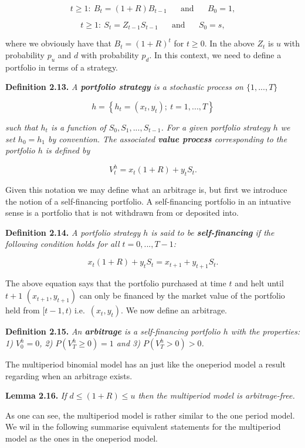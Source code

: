 \documentclass[
]{article}
\begin{document}
\[
t\ge1:\ B_t=(1+R)B_{t-1}\hspace{20pt}\text{and}\hspace{20pt}B_0=1,
\]

\[
t\ge1:\ S_t=Z_{t-1}S_{t-1}\hspace{20pt}\text{and}\hspace{20pt}S_0=s,
\]

where we obviously have that \(B_t=(1+R)^t\) for \(t\ge 0\). In the
above \(Z_t\) is \(u\) with probability \(p_u\) and \(d\) with
probability \(p_d\). In this context, we need to define a portfolio in
terms of a strategy.

\textbf{Definition 2.13.} \emph{A \textbf{portfolio strategy} is a
stochastic process on \(\{1,...,T\}\)}

\[
h=\left\{h_t=(x_t,y_t);\ t=1,...,T\right\}
\]

\emph{such that \(h_t\) is a function of \(S_0,S_1,...,S_{t-1}\). For a
given portfolio strategy \(h\) we set \(h_0=h_1\) by convention. The
associated \textbf{value process} corresponding to the portfolio \(h\)
is defined by}

\[
V_t^h=x_t(1+R)+y_tS_t.
\]

Given this notation we may define what an arbitrage is, but first we
introduce the notion of a self-financing portfolio. A self-financing
portfolio in an intuative sense is a portfolio that is not withdrawn
from or deposited into.

\textbf{Definition 2.14.} \emph{A portfolio strategy \(h\) is said to be
\textbf{self-financing} if the following condition holds for all
\(t=0,...,T-1\):}

\[
x_t(1+R)+y_tS_t=x_{t+1}+y_{t+1}S_t.
\]

The above equation says that the portfolio purchased at time \(t\) and
helt until \(t+1\) \((x_{t+1},y_{t+1})\) can only be financed by the
market value of the portfolio held from \([t-1,t)\)
i.e.~\((x_{t},y_{t})\). We now define an arbitrage.

\textbf{Definition 2.15.} \emph{An \textbf{arbitrage} is a
self-financing portfolio \(h\) with the properties: 1) \(V^h_0=0\), 2)
\(P(V^h_T\ge 0)=1\) and 3) \(P(V^h_T>0)>0\).}

The multiperiod binomial model has an just like the oneperiod model a
result regarding when an arbitrage exists.

\textbf{Lemma 2.16.} \emph{If \(d\le (1+R)\le u\) then the multiperiod
model is arbitrage-free.}

As one can see, the multiperiod model is rather similar to the one
period model. We wil in the following summarise equivalent statements
for the multiperiod model as the ones in the oneperiod model.
\end{document}
